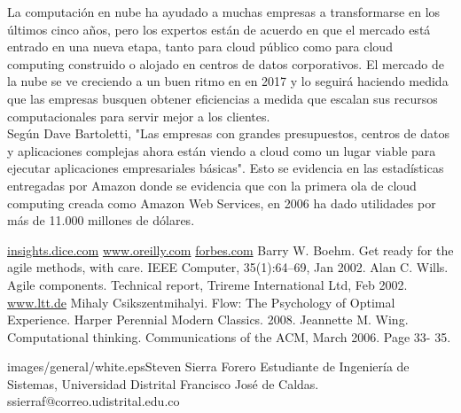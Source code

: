 \begin{multicols}{2}
La computación en nube ha ayudado a muchas empresas a transformarse en los últimos cinco años, pero los expertos están de acuerdo en que el mercado está entrado en una nueva etapa, tanto para cloud público como para cloud computing construido o alojado en centros de datos corporativos. El mercado de la nube se ve creciendo a un buen ritmo en en 2017 y lo seguirá haciendo medida que las empresas busquen obtener eficiencias a medida que escalan sus recursos computacionales para servir mejor a los clientes.\\


Según Dave Bartoletti, "Las empresas con grandes presupuestos, centros de datos y aplicaciones complejas ahora están viendo a cloud como un lugar viable para ejecutar aplicaciones empresariales básicas". Esto se evidencia en las estadísticas entregadas por Amazon donde se evidencia que con la primera ola de cloud computing creada como Amazon Web Services, en 2006 ha dado utilidades por más de 11.000 millones de dólares.\\



\begin{bibliografia}
\href{http://insights.dice.com/trends/}{insights.dice.com}
\href{https://www.oreilly.com/ideas/5-software-development-trends-shaping- enterprise}{www.oreilly.com}
\href{https://forbes.com}{forbes.com}
Barry W. Boehm. Get ready for the agile methods, with care. IEEE Computer, 35(1):64–69, Jan 2002.
Alan C. Wills. Agile components. Technical report, Trireme International	Ltd,	Feb	2002. \href{http://www.ltt.de/otland/experts/a.c.wills.shtml}{www.ltt.de}
Mihaly Csikszentmihalyi. Flow: The Psychology of Optimal Experience. Harper Perennial Modern Classics. 2008.
Jeannette M. Wing. Computational thinking. Communications of the ACM, March 2006. Page 33- 35.
\end{bibliografia}


\begin{biografia}{images/general/white.eps}{Steven Sierra Forero} Estudiante de Ingeniería de Sistemas, Universidad Distrital Francisco José de Caldas.\\ssierraf@correo.udistrital.edu.co
\end{biografia}

\raggedcolumns
\pagebreak


\end{multicols}

\clearpage
\pagebreak
